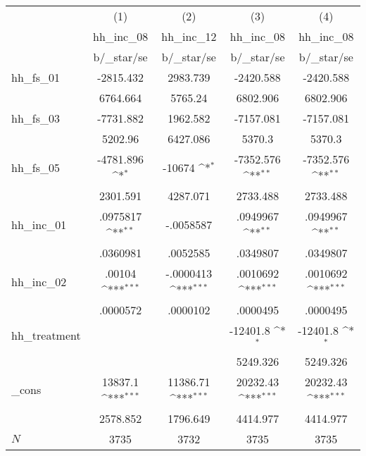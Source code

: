 {
\def\sym#1{\ifmmode^{#1}\else\(^{#1}\)\fi}
\begin{tabular}{l*{4}{c}}
\hline\hline
            &\multicolumn{1}{c}{(1)}&\multicolumn{1}{c}{(2)}&\multicolumn{1}{c}{(3)}&\multicolumn{1}{c}{(4)}\\
            &\multicolumn{1}{c}{hh\_inc\_08}&\multicolumn{1}{c}{hh\_inc\_12}&\multicolumn{1}{c}{hh\_inc\_08}&\multicolumn{1}{c}{hh\_inc\_08}\\
            &  b/\_star/se&  b/\_star/se&  b/\_star/se&  b/\_star/se\\
\hline
hh\_fs\_01    &  -2815.432 &   2983.739 &  -2420.588 &  -2420.588 \\
            &    6764.664&     5765.24&    6802.906&    6802.906\\
hh\_fs\_03    &  -7731.882 &   1962.582 &  -7157.081 &  -7157.081 \\
            &     5202.96&    6427.086&      5370.3&      5370.3\\
hh\_fs\_05    &-4781.896 \sym{*}&-10674 \sym{*}&-7352.576 \sym{**}&-7352.576 \sym{**}\\
            &    2301.591&    4287.071&    2733.488&    2733.488\\
hh\_inc\_01   &.0975817 \sym{**}&  -.0058587 &.0949967 \sym{**}&.0949967 \sym{**}\\
            &    .0360981&    .0052585&    .0349807&    .0349807\\
hh\_inc\_02   &.00104 \sym{***}&-.0000413 \sym{***}&.0010692 \sym{***}&.0010692 \sym{***}\\
            &    .0000572&    .0000102&    .0000495&    .0000495\\
hh\_treatment&            &            &-12401.8 \sym{*}&-12401.8 \sym{*}\\
            &            &            &    5249.326&    5249.326\\
\_cons      &13837.1 \sym{***}&11386.71 \sym{***}&20232.43 \sym{***}&20232.43 \sym{***}\\
            &    2578.852&    1796.649&    4414.977&    4414.977\\
\hline
\(N\)       &        3735&        3732&        3735&        3735\\
\hline\hline
\end{tabular}
}
